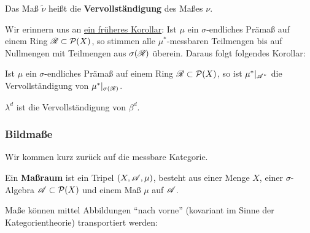 \begin{definition}
\begin{mdframed}
Das Maß $\widetilde{\nu}$ heißt die \textbf{Vervollständigung} des Maßes $\nu$. 
\end{mdframed}
\end{definition}

Wir erinnern uns an \hyperref[uebereinstimmung-alg]{ein früheres Korollar}: Ist $\mu$ ein $\sigma$-endliches Prämaß auf einem Ring $\RR \subset \PP(X)$, so stimmen alle $\mu^*$-messbaren Teilmengen bis auf Nullmengen mit Teilmengen aus $\sigma(\RR)$ überein. Daraus folgt folgendes Korollar:

\begin{korollar}
\begin{mdframed}
Ist $\mu$ ein $\sigma$-endliches Prämaß auf einem Ring $\RR \subset \PP(X)$, so ist $\mu^*|_{\AA^*}$ die Vervollständigung von $\mu^*|_{\sigma(\RR)}$.
\end{mdframed}
\end{korollar}

\begin{hauptbsp}
\begin{mdframed}
$\lambda^d$ ist die Vervollständigung von $\beta^d$.
\end{mdframed}
\end{hauptbsp}

\subsubsection{Bildmaße}
Wir kommen kurz zurück auf die messbare Kategorie.
\begin{definition}
\begin{mdframed}
Ein \textbf{Maßraum} ist ein Tripel $(X,\AA,\mu)$, besteht aus einer Menge $X$, einer $\sigma$-Algebra $\AA\subset \PP(X)$ und einem Maß $\mu$ auf $\AA$.
\end{mdframed}
\end{definition}

Maße können mittel Abbildungen ``nach vorne'' (kovariant im Sinne der Kategorientheorie) transportiert werden:

